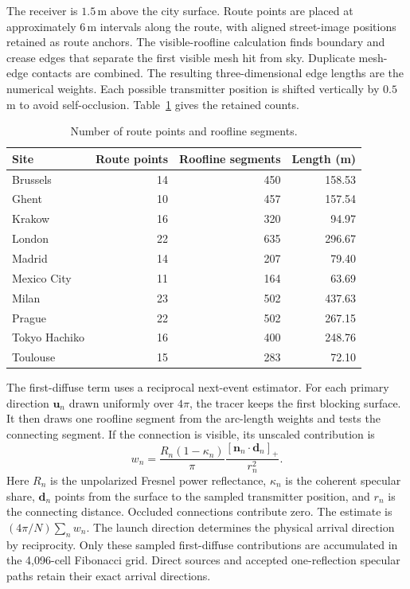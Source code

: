 The receiver is $1.5\,$m above the city surface. Route points are placed at
approximately $6\,$m intervals along the route, with aligned street-image
positions retained as route anchors. The visible-roofline calculation finds boundary
and crease edges that separate the first visible mesh hit from sky. Duplicate
mesh-edge contacts are combined. The resulting three-dimensional edge
lengths are the numerical weights. Each possible transmitter position is shifted vertically by
$0.5\,$m to avoid self-occlusion. Table~\ref{tab:si-source-quadrature} gives the
retained counts.

\begin{table}[!t]
  \caption{Number of route points and roofline segments.}
  \label{tab:si-source-quadrature}
  \centering
  \begin{tabular}{lrrr}
    \toprule
    Site & Route points & Roofline segments & Length (m) \\
    \midrule
    Brussels & 14 & 450 & 158.53 \\
    Ghent & 10 & 457 & 157.54 \\
    Krakow & 16 & 320 & 94.97 \\
    London & 22 & 635 & 296.67 \\
    Madrid & 14 & 207 & 79.40 \\
    Mexico City & 11 & 164 & 63.69 \\
    Milan & 23 & 502 & 437.63 \\
    Prague & 22 & 502 & 267.15 \\
    Tokyo Hachiko & 16 & 400 & 248.76 \\
    Toulouse & 15 & 283 & 72.10 \\
    \bottomrule
  \end{tabular}
\end{table}

The first-diffuse term uses a reciprocal next-event estimator. For each
primary direction $\mathbf u_n$ drawn uniformly over $4\pi$, the tracer keeps
the first blocking surface. It then draws one roofline segment from the
arc-length weights and tests the connecting segment. If the connection is
visible, its unscaled contribution is
\begin{equation}
  w_n = \frac{R_n(1-\kappa_n)}{\pi}
  \frac{[\mathbf n_n\!\cdot\!\mathbf d_n]_+}{r_n^2}.
\end{equation}
Here $R_n$ is the unpolarized Fresnel power reflectance, $\kappa_n$ is the
coherent specular share, $\mathbf d_n$ points from the surface to the sampled
transmitter position, and $r_n$ is the connecting distance. Occluded connections contribute
zero. The estimate is $(4\pi/N)\sum_n w_n$. The launch direction determines the
physical arrival direction by reciprocity. Only these sampled first-diffuse
contributions are accumulated in the 4,096-cell Fibonacci grid. Direct sources
and accepted one-reflection specular paths retain their exact arrival directions.

